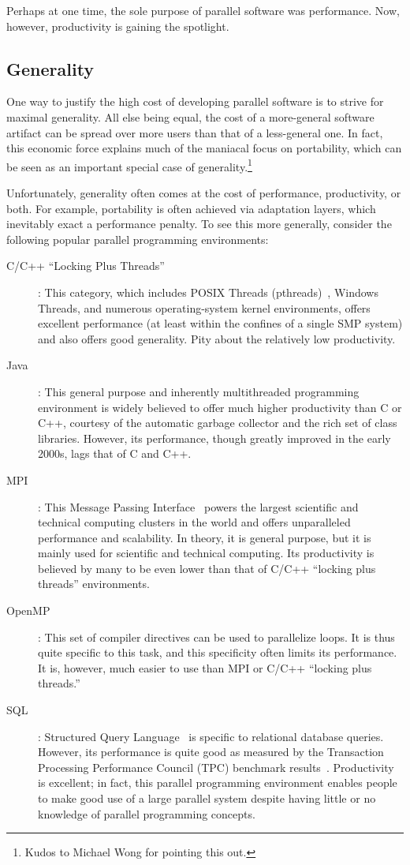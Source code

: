 Perhaps at one time, the sole purpose of parallel software was performance.
Now, however, productivity is gaining the spotlight.

\subsection{Generality}
\label{sec:intro:Generality}

One way to justify the high cost of developing parallel software
is to strive for maximal generality.
All else being equal, the cost of a more-general software artifact
can be spread over more users than that of a less-general one.
In fact, this economic force explains much of the maniacal focus
on portability, which can be seen as an important special case
of generality.\footnote{
	Kudos to Michael Wong for pointing this out.}

Unfortunately, generality often comes at the cost of performance,
productivity, or both.
For example, portability is often achieved via adaptation layers,
which inevitably exact a performance penalty.
To see this more generally, consider the following popular parallel
programming environments:

\begin{description}
\item[C/C++ ``Locking Plus Threads'']: This category, which includes
	POSIX Threads (pthreads)~\cite{OpenGroup1997pthreads},
	Windows Threads, and numerous
	operating-system kernel environments, offers excellent performance
	(at least within the confines of a single SMP system)
	and also offers good generality.
	Pity about the relatively low productivity.
\item[Java]: This general purpose and inherently multithreaded
	programming environment	is widely believed to offer much higher
	productivity than C or C++, courtesy of the automatic garbage collector
	and the rich set of class libraries.
	However, its performance, though greatly improved in the early
	2000s, lags that of C and C++.
\item[MPI]: This Message Passing Interface~\cite{MPIForum2008} powers
	the largest scientific and technical computing clusters in
	the world and offers unparalleled performance and scalability.
	In theory, it is general purpose, but it is mainly used
	for scientific and technical computing.
	Its productivity is believed by many to be even lower than that
	of C/C++ ``locking plus threads'' environments.
\item[OpenMP]: This set of compiler directives can be used
	to parallelize loops.  It is thus quite specific to this
	task, and this specificity often limits its performance.
	It is, however, much easier to use than MPI or C/C++
	``locking plus threads.''
\item[SQL]: Structured Query Language~\cite{DIS9075SQL92} is
	specific to relational database queries.
	However, its performance is quite good as measured by the
	Transaction Processing Performance Council (TPC)
	benchmark results~\cite{TPC}.
	Productivity is excellent; in fact, this parallel programming
	environment enables people to make good use of a large parallel
	system despite having little or no knowledge of parallel
	programming concepts.
\end{description}

